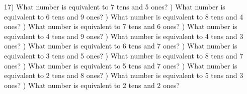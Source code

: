 \documentclass{article}%
\begin{document}
17) What number is equivalent to 7 tens and 5 ones?%
\newline%
\newline%
) What number is equivalent to 6 tens and 9 ones?%
\newline%
\newline%
) What number is equivalent to 8 tens and 4 ones?%
\newline%
\newline%
) What number is equivalent to 7 tens and 6 ones?%
\newline%
\newline%
) What number is equivalent to 4 tens and 9 ones?%
\newline%
\newline%
) What number is equivalent to 4 tens and 3 ones?%
\newline%
\newline%
) What number is equivalent to 6 tens and 7 ones?%
\newline%
\newline%
) What number is equivalent to 3 tens and 5 ones?%
\newline%
\newline%
) What number is equivalent to 8 tens and 7 ones?%
\newline%
\newline%
) What number is equivalent to 5 tens and 7 ones?%
\newline%
\newline%
) What number is equivalent to 2 tens and 8 ones?%
\newline%
\newline%
) What number is equivalent to 5 tens and 3 ones?%
\newline%
\newline%
) What number is equivalent to 2 tens and 2 ones?%
\newline%
\newline%
\newline%
\end{document}
